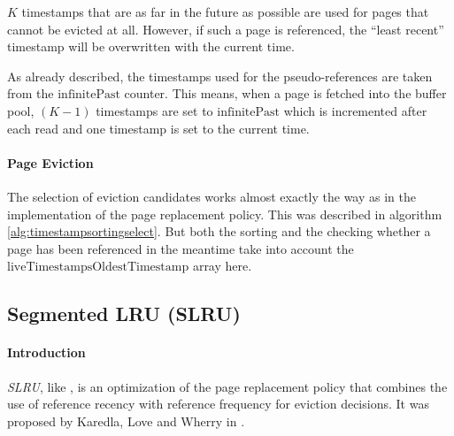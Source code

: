     $K$ timestamps that are as far in the future as possible are used for pages that cannot be evicted at all. However, if such a page is referenced, the  ``least recent'' timestamp will be overwritten with the current time.

    As already described, the timestamps used for the pseudo-references are taken from the $\text{infinitePast}$ counter. This means, when a page is fetched into the buffer pool, $\left(K - 1\right)$ timestamps are set to $\text{infinitePast}$ which is incremented after each read and one timestamp is set to the current time.
    
\paragraph{Page Eviction}

    The selection of eviction candidates works almost exactly the way as in the  implementation of the  page replacement policy. This was described in algorithm \ref{alg:timestampsortingselect}. But both the sorting and the checking whether a page has been referenced in the meantime take into account the $\text{liveTimestampsOldestTimestamp}$ array here.

\subsection[SLRU]{Segmented LRU (SLRU)} \label{subsec:slru}

\paragraph{Introduction}

    \emph{SLRU}, like , is an optimization of the  page replacement policy that combines the use of reference recency with reference frequency for eviction decisions. It was proposed by Karedla, Love and Wherry in \cite{Karedla:1994}.

